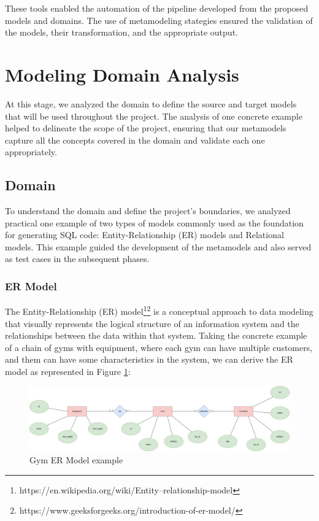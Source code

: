 \documentclass[10pt]{article}
\begin{document}
These tools enabled the automation of the pipeline developed from the proposed models and domains. The use of metamodeling stategies ensured the validation of the models, their transformation, and the appropriate output.

\section{Modeling Domain Analysis}

At this stage, we analyzed the domain to define the source and target models that will be used throughout the project. The analysis of one concrete example helped to delineate the scope of the project, ensuring that our metamodels capture all the concepts covered in the domain and validate each one appropriately.

\subsection{Domain}

To understand the domain and define the project's boundaries, we analyzed practical one example of two types of models commonly used as the foundation for generating SQL code: Entity-Relationship (ER) models and Relational models. This example guided the development of the metamodels and also served as test cases in the subsequent phases.

\subsubsection{ER Model}

The Entity-Relationship (ER) model\footnote{https://en.wikipedia.org/wiki/Entity–relationship-model}\footnote{https://www.geeksforgeeks.org/introduction-of-er-model/} is a conceptual approach to data modeling that visually represents the logical structure of an information system and the relationships between the data within that system. Taking the concrete example of a chain of gyms with equipment, where each gym can have multiple customers, and them can have some characteristics in the system, we can derive the ER model as represented in Figure \ref{figure1}:

\begin{center}
    \begin{figure}[H]
        \centering
        \includegraphics[width=1.0\textwidth]{imgs/er-model.png}
            \caption{Gym ER Model example}
        \label{figure1}
    \end{figure}
\end{center}
\end{document}
